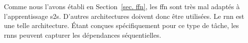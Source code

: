 \section{}
\label{sec. rnn}

Comme nous l'avons établi en Section~\ref{sec. ffn}, 
les \gls{ffn} sont très mal adaptés à l'apprentissage \gls{s2s}.
D'autres architectures doivent donc être utilisées.
Le \gls{rnn} est une telle architecture.
Étant conçues spécifiquement pour ce type de tâche, 
les \glspl{rnn} peuvent capturer les dépendances séquentielles.

